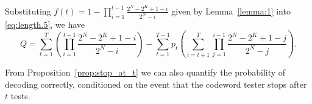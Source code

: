 \documentclass[letterpaper,draftclsnofoot,onecolumn]{IEEEtran}
\begin{document}
    Substituting $f(t) = 1 - \prod_{i=1}^{t-1}\frac{2^N-2^K+1-i}{2^N-i}$ given by Lemma~\ref{lemma:1} into \eqref{eq:length.5}, we have
    \begin{equation}
        Q = \sum_{t=1}^{T}\left(\prod_{i=1}^{t-1}\frac{2^N-2^K+1-i}{2^N-i}\right) - \sum_{t=1}^{T-1}p_t\left(\sum_{i=t+1}^{T}\prod_{j=1}^{i-1}\frac{2^N-2^K+1-j}{2^N-j}\right).
    \end{equation}


From Proposition~\ref{prop:stop_at_t} we can also quantify the probability of decoding correctly, conditioned on the event that the codeword tester stops after $t$ tests.
\end{document}
